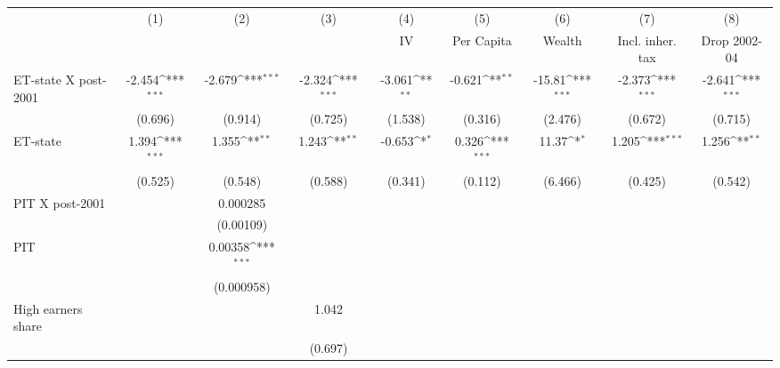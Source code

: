 {
\def\sym#1{\ifmmode^{#1}\else\(^{#1}\)\fi}
\begin{tabular}{l*{8}{c}}
\hline\hline
                &\multicolumn{1}{c}{(1)}&\multicolumn{1}{c}{(2)}&\multicolumn{1}{c}{(3)}&\multicolumn{1}{c}{(4)}&\multicolumn{1}{c}{(5)}&\multicolumn{1}{c}{(6)}&\multicolumn{1}{c}{(7)}&\multicolumn{1}{c}{(8)}\\
                &\multicolumn{1}{c}{}&\multicolumn{1}{c}{}&\multicolumn{1}{c}{}&\multicolumn{1}{c}{IV}&\multicolumn{1}{c}{Per Capita}&\multicolumn{1}{c}{Wealth}&\multicolumn{1}{c}{Incl. inher. tax}&\multicolumn{1}{c}{Drop 2002-04}\\
\hline
ET-state X post-2001&   -2.454\sym{***}&   -2.679\sym{***}&   -2.324\sym{***}&   -3.061\sym{**} &   -0.621\sym{**} &   -15.81\sym{***}&   -2.373\sym{***}&   -2.641\sym{***}\\
                &  (0.696)         &  (0.914)         &  (0.725)         &  (1.538)         &  (0.316)         &  (2.476)         &  (0.672)         &  (0.715)         \\
[1em]
ET-state        &    1.394\sym{***}&    1.355\sym{**} &    1.243\sym{**} &   -0.653\sym{*}  &    0.326\sym{***}&    11.37\sym{*}  &    1.205\sym{***}&    1.256\sym{**} \\
                &  (0.525)         &  (0.548)         &  (0.588)         &  (0.341)         &  (0.112)         &  (6.466)         &  (0.425)         &  (0.542)         \\
[1em]
PIT X post-2001 &                  & 0.000285         &                  &                  &                  &                  &                  &                  \\
                &                  &(0.00109)         &                  &                  &                  &                  &                  &                  \\
[1em]
PIT             &                  &  0.00358\sym{***}&                  &                  &                  &                  &                  &                  \\
                &                  &(0.000958)         &                  &                  &                  &                  &                  &                  \\
[1em]
High earners share&                  &                  &    1.042         &                  &                  &                  &                  &                  \\
                &                  &                  &  (0.697)         &                  &                  &                  &                  &                  \\

\end{tabular}}
